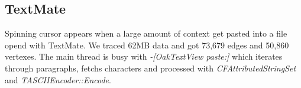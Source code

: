 \subsection{TextMate}

Spinning cursor appears when a large amount of context get pasted into a file
opend with TextMate.  We traced 62MB data and got 73,679 edges and 50,860
vertexes.  The main thread is busy with \textit{-[OakTextView paste:]} which
iterates through paragraphs, fetchs characters and processed with
\textit{CFAttributedStringSet} and \textit{TASCIIEncoder::Encode}.
